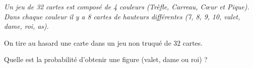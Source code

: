 
\textit{Un jeu de 32 cartes est composé de 4 couleurs (Trèfle, Carreau, Cœur et Pique). Dans chaque couleur il y a 8 cartes de hauteurs différentes (7, 8, 9, 10, valet, dame, roi, as).}

\medskip

On tire au hasard une carte dans un jeu non truqué de $32$ cartes.

Quelle est la probabilité d'obtenir une figure (valet, dame ou roi) ?

\smallskip
{}
